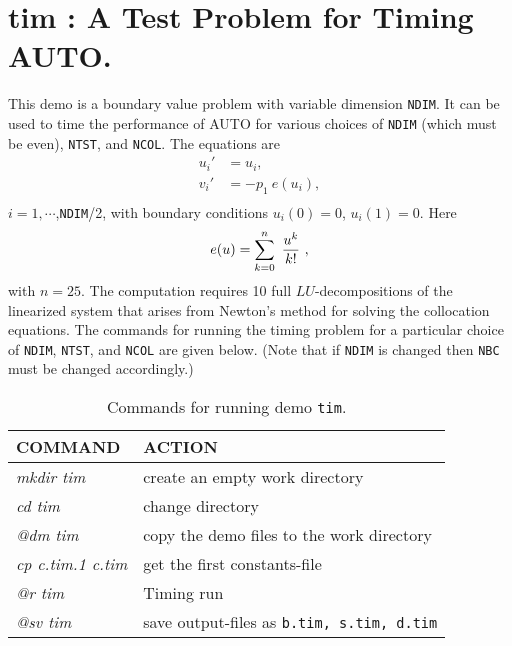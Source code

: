 \documentclass[12pt]{report}
\begin{document}
\section{ tim : A Test Problem for Timing {\cal AUTO}.} \label{sec:Demos_tim}
This demo is a boundary value problem with variable dimension {\tt NDIM}. 
It can be used to time the performance of {\cal AUTO} 
for various choices of {\tt NDIM} (which must be even), {\tt NTST}, and {\tt NCOL}.
The equations are
\begin{equation} \begin{array}{cl}
  u_i ' &= u_i  ,  \\
  v_i ' &= -p_1 ~  e(u_i) , \\
\end{array} \end{equation}
$i=1,\cdots$,{\tt NDIM}/2,
with boundary conditions $ u_i(0)=0$, $u_i(1)=0.$
Here 
$$ e(u) = \sum_{k=0}^{n} ~ {u^k \over k!} ~ , $$
with $n=25$.
The computation requires 10 full $LU$-decompositions of the linearized system
that arises from Newton's method for solving the collocation equations.
The commands for running the timing problem for a particular choice 
of {\tt NDIM}, {\tt NTST}, and {\tt NCOL} are given below.
(Note that if {\tt NDIM} is changed then {\tt NBC} must be changed accordingly.)

\begin{table}[htbp]
\begin{center}
\begin{tabular}{| l | l |}
\hline
  COMMAND  & ACTION \\
\hline
  {\it mkdir tim} & create an empty work directory \\ 
  {\it cd tim} & change directory \\
  {\it @dm tim} & copy the demo files to the work directory \\
\hline
  {\it cp c.tim.1 c.tim} & get the first constants-file \\ 
  {\it @r tim} & Timing run \\ 
  {\it @sv tim} & save output-files as {\tt b.tim, s.tim, d.tim} \\ 
\hline
\end{tabular}
\caption{Commands for running demo {\tt tim}.}
\label{tbl:demo_tim}
\end{center}
\end{table}
\end{document}
